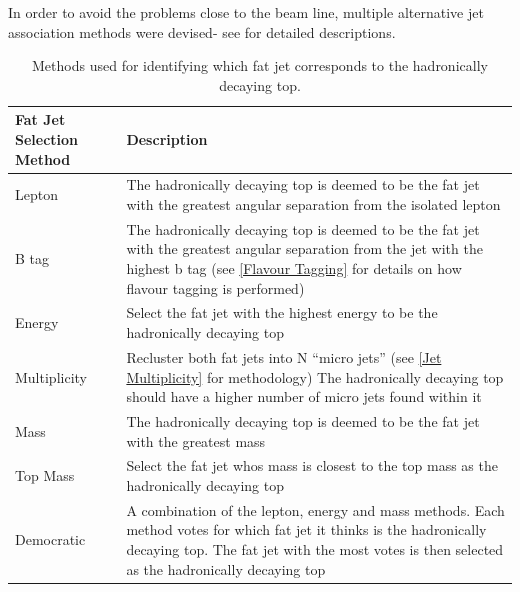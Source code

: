 In order to avoid the problems close to the beam line, multiple alternative jet association methods were devised- see  for detailed descriptions.
\begin{table}
  \centering
  \begin{tabular}{l |p{100mm}}
    \toprule
    Fat Jet Selection Method     & Description  \\
    \midrule
    Lepton & The hadronically decaying top is deemed to be the fat jet with the greatest angular separation from the isolated lepton\\
    \midrule
    B tag & The hadronically decaying top is deemed to be the fat jet with the greatest angular separation from the jet with the highest b tag (see \ref{Flavour Tagging} for details on how flavour tagging is performed)\\
    \midrule
    Energy & Select the fat jet with the highest energy to be the hadronically decaying top\\
    \midrule
    Multiplicity & Recluster both fat jets into N ``micro jets'' (see \ref{Jet Multiplicity} for methodology) The hadronically decaying top should have a higher number of micro jets found within it\\
    \midrule
    Mass & The hadronically decaying top is deemed to be the fat jet with the greatest mass \\
    \midrule
    Top Mass & Select the fat jet whos mass is closest to the top mass as the hadronically decaying top \\
    \midrule
    Democratic & A combination of the lepton, energy and mass methods. Each method votes for which fat jet it thinks is the hadronically decaying top. The fat jet with the most votes is then selected as the hadronically decaying top  \\
    \bottomrule
  \end{tabular}
  \caption{Methods used for identifying which fat jet corresponds to the hadronically decaying top.}
  \label{tab:methodDescription}
\end{table}

